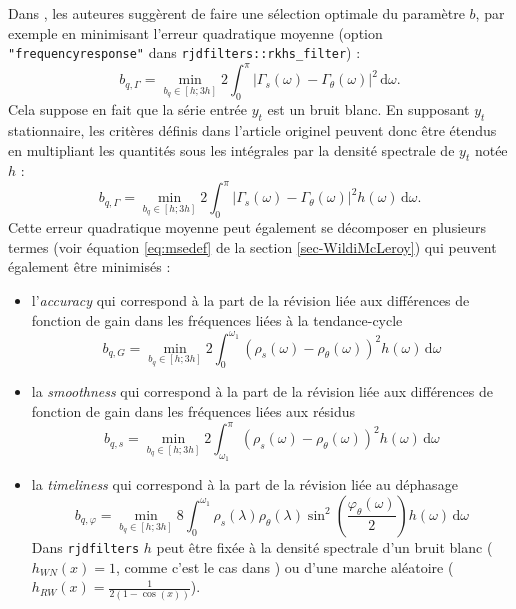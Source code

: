 \documentclass[
  12pt,
  a4paper,french]{article}
\newcommand\1{\mathds{1}}
\newcommand\ud{\,\mathrm{d}}
\begin{document}
Dans \textcite{dagumbianconcini2015new}, les auteures suggèrent de faire une sélection optimale du paramètre \(b\), par exemple en minimisant l'erreur quadratique moyenne (option \texttt{"frequencyresponse"} dans \texttt{rjdfilters::rkhs\_filter}) :
\[
b_{q,\Gamma}=\underset{b_q\in[h; 3h]}{\min}
2\int_{0}^{\pi}
\lvert \Gamma_s(\omega)-\Gamma_\theta(\omega)\rvert^2\ud \omega.
\]
Cela suppose en fait que la série entrée \(y_t\) est un bruit blanc.
En supposant \(y_t\) stationnaire, les critères définis dans l'article originel peuvent donc être étendus en multipliant les quantités sous les intégrales par la densité spectrale de \(y_t\) notée \(h\) :
\[
b_{q,\Gamma}=\underset{b_q\in[h; 3h]}{\min}
2\int_{0}^{\pi}
\lvert \Gamma_s(\omega)-\Gamma_\theta(\omega)\rvert^2h(\omega)\ud \omega.
\]
Cette erreur quadratique moyenne peut également se décomposer en plusieurs termes (voir équation \eqref{eq:msedef} de la section \ref{sec-WildiMcLeroy}) qui peuvent également être minimisés :

\begin{itemize}
\item
  l'\emph{accuracy} qui correspond à la part de la révision liée aux différences de fonction de gain dans les fréquences liées à la tendance-cycle
  \[
  b_{q,G}=\underset{b_q\in[h; 3h]}{\min}
  2\int_{0}^{\omega_1}
  \left(\rho_s(\omega)-\rho_\theta(\omega)\right)^{2} h(\omega)\ud \omega
  \]
\item
  la \emph{smoothness} qui correspond à la part de la révision liée aux différences de fonction de gain dans les fréquences liées aux résidus
  \[
  b_{q,s}=\underset{b_q\in[h; 3h]}{\min}
  2\int_{\omega_1}^{\pi}
  \left(\rho_s(\omega)-\rho_\theta(\omega)\right)^{2} h(\omega)\ud \omega
  \]
\item
  la \emph{timeliness} qui correspond à la part de la révision liée au déphasage
  \[
  b_{q,\varphi}=\underset{b_q\in[h; 3h]}{\min}
  8\int_{0}^{\omega_1}
  \rho_s(\lambda)\rho_\theta(\lambda)\sin^{2}\left(\frac{\varphi_\theta(\omega)}{2}\right)h(\omega)\ud \omega
  \]
  Dans \texttt{rjdfilters} \(h\) peut être fixée à la densité spectrale d'un bruit blanc (\(h_{WN}(x)=1\), comme c'est le cas dans \textcite{dagumbianconcini2015new}) ou d'une marche aléatoire (\(h_{RW}(x)=\frac{1}{2(1-\cos(x))}\)).
\end{itemize}
\end{document}
